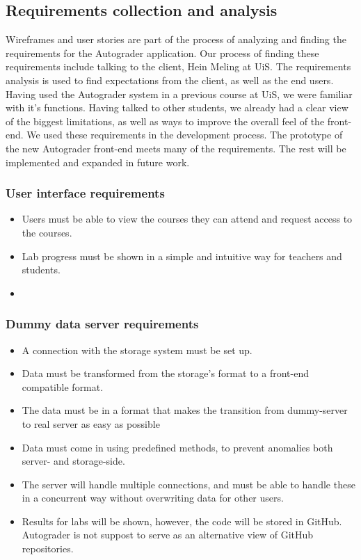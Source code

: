 \subsection{Requirements collection and analysis}
Wireframes and user stories are part of the process of analyzing and finding the requirements for the Autograder application. Our process of finding these requirements include talking to the client, Hein Meling at UiS. The requirements analysis is used to find expectations from the client, as well as the end users. Having used the Autograder system in a previous course at UiS, we were familiar with it's functions. Having talked to other students, we already had a clear view of the biggest limitations, as well as ways to improve the overall feel of the front-end. We used these requirements in the development process. The prototype of the new Autograder front-end meets many of the requirements. The rest will be implemented and expanded in future work.

\subsubsection{User interface requirements}
\begin{itemize}
\item Users must be able to view the courses they can attend and request access to the courses.
\item Lab progress must be shown in a simple and intuitive way for teachers and students.
\item 
\end{itemize}

\subsubsection{Dummy data server requirements}
\begin{itemize}
\item A connection with the storage system must be set up.
\item Data must be transformed from the storage's format to a front-end compatible format.
\item The data must be in a format that makes the transition from dummy-server to real server as easy as possible
\item Data must come in using predefined methods, to prevent anomalies both server- and storage-side.
\item The server will handle multiple connections, and must be able to handle these in a concurrent way without overwriting data for other users.
\item Results for labs will be shown, however, the code will be stored in GitHub. Autograder is not suppost to serve as an alternative view of GitHub repositories.
\end{itemize}

